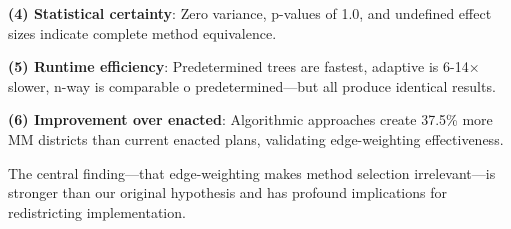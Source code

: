 \textbf{(4) Statistical certainty}: Zero variance, p-values of 1.0, and undefined effect sizes indicate complete method equivalence.

\textbf{(5) Runtime efficiency}: Predetermined trees are fastest, adaptive is 6-14× slower, n-way is comparable 	o predetermined—but all produce identical results.

\textbf{(6) Improvement over enacted}: Algorithmic approaches create 37.5\% more MM districts than current enacted plans, validating edge-weighting effectiveness.

The central finding—that edge-weighting makes method selection irrelevant—is stronger than our original hypothesis and has profound implications for redistricting implementation.
